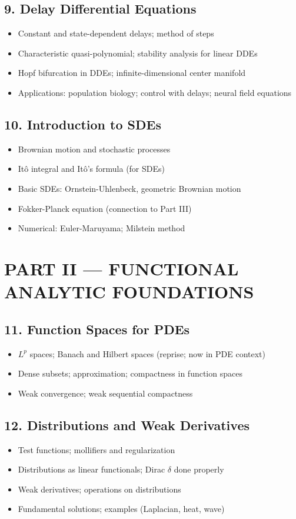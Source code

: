 \subsection{9. Delay Differential Equations}
\begin{itemize}
\item Constant and state-dependent delays; method of steps
\item Characteristic quasi-polynomial; stability analysis for linear DDEs
\item Hopf bifurcation in DDEs; infinite-dimensional center manifold
\item Applications: population biology; control with delays; neural field equations
\end{itemize}

\subsection{10. Introduction to SDEs}
\begin{itemize}
\item Brownian motion and stochastic processes
\item It\^o integral and It\^o's formula (for SDEs)
\item Basic SDEs: Ornstein-Uhlenbeck, geometric Brownian motion
\item Fokker-Planck equation (connection to Part III)
\item Numerical: Euler-Maruyama; Milstein method
\end{itemize}

\section{PART II --- FUNCTIONAL ANALYTIC FOUNDATIONS}

\subsection{11. Function Spaces for PDEs}
\begin{itemize}
\item $L^p$ spaces; Banach and Hilbert spaces (reprise; now in PDE context)
\item Dense subsets; approximation; compactness in function spaces
\item Weak convergence; weak sequential compactness
\end{itemize}

\subsection{12. Distributions and Weak Derivatives}
\begin{itemize}
\item Test functions; mollifiers and regularization
\item Distributions as linear functionals; Dirac $\delta$ done properly
\item Weak derivatives; operations on distributions
\item Fundamental solutions; examples (Laplacian, heat, wave)
\end{itemize}

